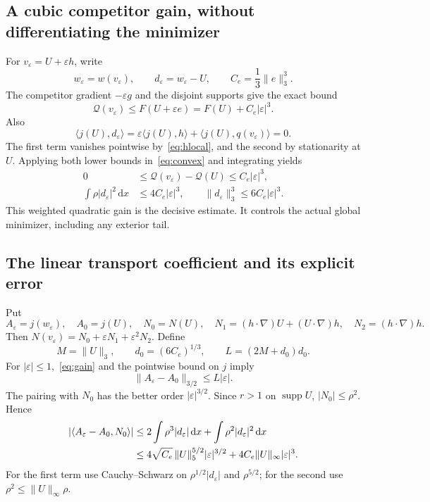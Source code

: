 \documentclass[11pt,a4paper]{article}
\theoremstyle{definition}
\newcommand{\Q}{\mathcal Q}
\newcommand{\dd}{\,\mathrm dx}
\newcommand{\eps}{\varepsilon}
\newcommand{\ip}[2]{\langle #1,#2\rangle}
\DeclareMathOperator{\supp}{supp}
\begin{document}
\subsection{A cubic competitor gain, without differentiating the minimizer}
For $v_\eps=U+\eps h$, write
\[
 w_\eps=w(v_\eps),\qquad d_\eps=w_\eps-U,\qquad
 C_e=\frac13\|e\|_3^3.
\]
The competitor gradient $-\eps g$ and the disjoint supports give the exact bound
\begin{equation}\label{eq:competitor}
 \Q(v_\eps)\le F(U+\eps e)=F(U)+C_e|\eps|^3.
\end{equation}
Also
\[
 \ip{j(U)}{d_\eps}
 =\eps\ip{j(U)}h+\ip{j(U)}{q(v_\eps)}=0.
\]
The first term vanishes pointwise by~\eqref{eq:hlocal}, and the second by stationarity at $U$. Applying both lower bounds in~\eqref{eq:convex} and integrating yields
\begin{equation}\label{eq:gain}
 \begin{split}
 0&\le\Q(v_\eps)-\Q(U)\le C_e|\eps|^3,\\
 \int\rho|d_\eps|^2\dd&\le4C_e|\eps|^3,\qquad
 \|d_\eps\|_3^3\le6C_e|\eps|^3.
 \end{split}
\end{equation}
This weighted quadratic gain is the decisive estimate. It controls the actual global minimizer, including any exterior tail.

\subsection{The linear transport coefficient and its explicit error}
Put
\[
 A_\eps=j(w_\eps),\quad A_0=j(U),\quad
 N_0=N(U),\quad N_1=(h\cdot\nabla)U+(U\cdot\nabla)h,\quad
 N_2=(h\cdot\nabla)h.
\]
Then $N(v_\eps)=N_0+\eps N_1+\eps^2N_2$. Define
\[
 M=\|U\|_3,\qquad d_0=(6C_e)^{1/3},\qquad L=(2M+d_0)d_0.
\]
For $|\eps|\le1$,~\eqref{eq:gain} and the pointwise bound on $j$ imply
\begin{equation}\label{eq:Adifference}
 \|A_\eps-A_0\|_{3/2}\le L|\eps|.
\end{equation}
The pairing with $N_0$ has the better order $|\eps|^{3/2}$. Since $r>1$ on $\supp U$, $|N_0|\le\rho^2$. Hence
\begin{align}
 |\ip{A_\eps-A_0}{N_0}|
 &\le2\int\rho^3|d_\eps|\dd+\int\rho^2|d_\eps|^2\dd\notag\\
 &\le4\sqrt{C_e}\,\|U\|_5^{5/2}|\eps|^{3/2}
       +4C_e\|U\|_\infty|\eps|^3.\label{eq:N0error}
\end{align}
For the first term use Cauchy--Schwarz on $\rho^{1/2}|d_\eps|$ and $\rho^{5/2}$; for the second use $\rho^2\le\|U\|_\infty\rho$.
\end{document}
